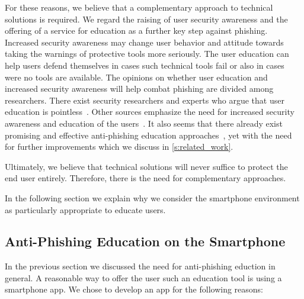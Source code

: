 \newline
For these reasons, we believe that a complementary approach to technical solutions is required.
We regard the raising of user security awareness and the offering of a service for education as a further key step against phishing.
Increased security awareness may change user behavior and attitude towards taking the warnings of protective tools more seriously.
The user education can help users defend themselves in cases such technical tools fail or also in cases were no tools are available.
The opinions on whether user education and increased security awareness will help combat phishing are divided among researchers.
There exist security researchers and experts who argue that user education is pointless~\cite{useredupointless, bruceschneieronsecuritytraining}.
Other sources emphasize the need for increased security awareness and education of the users~\cite{usereducebit, usereduscmagazine}.
It also seems that there already exist promising and effective anti-phishing education approaches~\cite{kumaraguru2007protecting, sheng2007antiphishingphil}, yet with the need for further improvements which we discuss in \autoref{s:related_work}.

Ultimately, we believe that technical solutions will never suffice to protect the end user entirely.
Therefore, there is the need for complementary approaches.

In the following section we explain why we consider the smartphone environment as particularly appropriate to educate users.

\subsection{Anti-Phishing Education on the Smartphone}
\label{s:antiphishing_on_smartphone}
In the previous section we discussed the need for anti-phishing eduction in general. A reasonable way to offer the user such an education tool is using a smartphone app.
We chose to develop an app for the following reasons:

